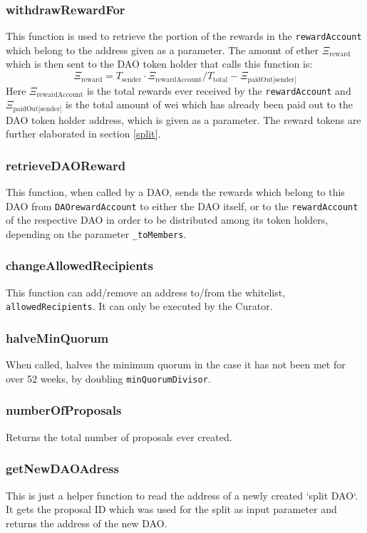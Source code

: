 \documentclass[9pt,oneside]{amsart}
\begin{document}
\begin{multicols}{2}
\subsubsection*{withdrawRewardFor}
This function is used to retrieve the portion of the rewards in the \verb|rewardAccount| which belong to the address given as a parameter.
The amount of ether $\Xi_{\text{reward}}$ which is then sent to the DAO token holder that calls this function is:
\begin{equation}
\Xi_{\text{reward}} = T_{\text{sender}} \cdot \Xi_{\text{rewardAccount}} / T_{\text{total}} - \Xi_{\text{paidOut[sender]}}
\end{equation}
Here $\Xi_{\text{rewardAccount}}$ is the total rewards ever received by the \verb|rewardAccount| and $\Xi_{\text{paidOut[sender]}}$ is the total amount of wei which has already been paid out to the DAO token holder address, which is given as a parameter. The reward tokens are further elaborated in section \ref{split}.

\subsubsection*{retrieveDAOReward}
This function, when called by a DAO, sends the rewards which belong to this DAO from \verb|DAOrewardAccount| to either the DAO itself, or to the \verb|rewardAccount| of the respective DAO in order to be distributed among its token holders, depending on the parameter \verb|_toMembers|.

\subsubsection*{changeAllowedRecipients}
This function can add/remove an address to/from the whitelist, \verb|allowedRecipients|. It can only be executed by the Curator.

\subsubsection*{halveMinQuorum}
When called, halves the minimum quorum in the case it has not been met for over 52 weeks, by doubling \verb|minQuorumDivisor|.

\subsubsection*{numberOfProposals}
Returns the total number of proposals ever created.

\subsubsection*{getNewDAOAdress}
This is just a helper function to read the address of a newly created `split DAO`. It gets the proposal ID which was used for the split as input parameter and returns the address of the new DAO.


\end{multicols}
\end{document}

